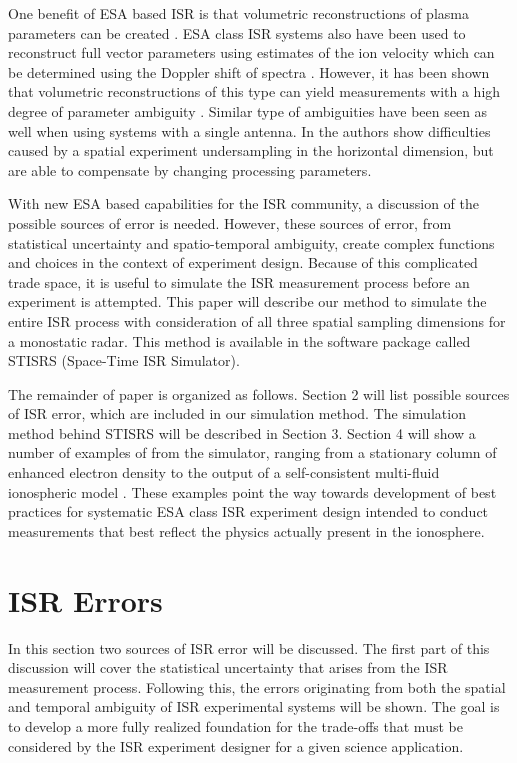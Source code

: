 \documentclass[draft,ras]{agutex}
\begin{document}
\begin{article}
One benefit of ESA based ISR is that volumetric reconstructions of plasma parameters can be created \citep{Semeter2009738, Nicolls:2007ie, dahlgren2012di}. ESA class ISR systems also have been used to reconstruct full vector parameters using estimates of the ion velocity which can be determined using the Doppler shift of spectra \citep{butler:imagingfregiondrifts,RDS:RDS20195}. However, it has been shown that volumetric reconstructions of this type can yield measurements with a high degree of parameter ambiguity \citep{Dahlgren:2012dq}. Similar type of ambiguities have been seen as well when using systems with a single antenna. In \citet{Semeter:2005fo} the authors show difficulties caused by a spatial experiment undersampling in the horizontal dimension, but are able to compensate by changing processing parameters.

With new ESA based capabilities for the ISR community, a discussion of the possible sources of error is needed. However, these sources of error, from statistical uncertainty and spatio-temporal ambiguity, create complex functions and choices in the context of experiment design. Because of this complicated trade space, it is useful to simulate the ISR measurement process before an experiment is attempted. This paper will describe our method to simulate the entire ISR process with consideration of all three spatial sampling dimensions for a monostatic radar. This method is available in the software package called STISRS (Space-Time ISR Simulator).

The remainder of paper is organized as follows. Section 2 will list possible sources of ISR error, which are included in our simulation method. The simulation method behind STISRS will be described in Section 3. Section 4 will show a number of examples of from the simulator, ranging from a stationary column of enhanced electron density to the output of a self-consistent multi-fluid ionospheric model \citep{semeter:plasmatransport2012}. These examples point the way towards development of best practices for systematic ESA class ISR experiment design intended to conduct measurements that best reflect the physics actually present in the ionosphere.
\section{ISR Errors}

In this section two sources of ISR error will be discussed. The first part of this discussion will cover the statistical uncertainty that arises from the ISR measurement process. Following this, the errors originating from both the spatial and temporal ambiguity of ISR experimental systems will be shown. The goal is to develop a more fully realized foundation for the trade-offs that must be considered by the ISR experiment designer for a given science application.


\end{article}
\end{document}
